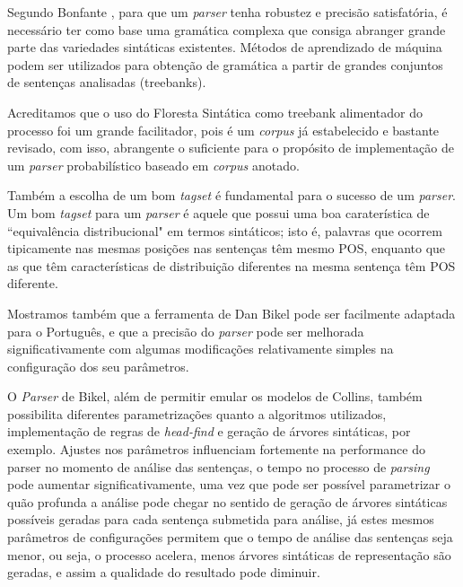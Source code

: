 Segundo Bonfante \cite{bonfante03}, para que um \emph{parser} tenha robustez e precisão satisfatória, é necessário ter como base uma gramática complexa que consiga abranger grande parte das variedades sintáticas existentes. Métodos de aprendizado de máquina podem ser utilizados para obtenção de gramática a partir de grandes conjuntos de sentenças analisadas (treebanks). 

Acreditamos que o uso do Floresta Sintática como treebank alimentador do processo foi um grande facilitador, pois é um \emph{corpus} já estabelecido e bastante revisado, com isso, abrangente o suficiente para o propósito de implementação de um \emph{parser} probabilístico baseado em \emph{corpus} anotado.

Também a escolha de um bom \emph{tagset} é fundamental para o sucesso de um \emph{parser}. Um bom \emph{tagset} para um \emph{parser} é aquele que possui uma boa caraterística de ``equivalência distribucional" em termos sintáticos; isto é, palavras que ocorrem tipicamente nas mesmas posições nas sentenças têm mesmo POS, enquanto que as que têm características de distribuição diferentes na mesma sentença têm POS diferente. 


Mostramos também que a ferramenta de Dan Bikel pode ser facilmente adaptada para o Português, e que a precisão do \emph{parser}
pode ser melhorada significativamente com algumas modificações relativamente simples na configuração dos seu parâmetros.

O \emph{Parser} de Bikel, além de permitir emular os modelos de Collins, também possibilita diferentes parametrizações quanto a algoritmos utilizados, implementação de regras de \emph{head-find} e geração de árvores sintáticas, por exemplo. Ajustes nos parâmetros influenciam fortemente na performance do parser no momento de análise das sentenças, o tempo no processo de \emph{parsing} pode aumentar significativamente, uma vez que pode ser possível parametrizar o quão profunda a análise pode chegar no sentido de geração de árvores sintáticas possíveis geradas para cada sentença submetida para análise, já estes mesmos parâmetros de configurações permitem que o tempo de análise das sentenças seja menor, ou seja, o processo acelera, menos árvores sintáticas de representação são geradas, e assim a qualidade do resultado pode diminuir.

